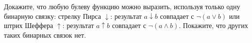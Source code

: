 Докажите, что любую булеву функцию можно выразить, используя только одну бинарную связку: стрелку Пирса  $\downarrow$:
результат $a \downarrow b$ совпадает с $\lnot (a \lor b)$ или штрих Шеффера $\uparrow$: результат $a \uparrow b$ совпадает с
$\lnot (a \land b)$. Покажите, что других таких бинарных связок нет.
